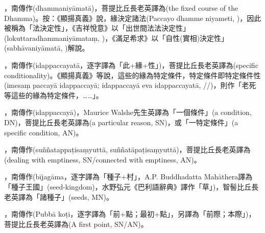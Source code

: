 \startitemgroup[noteitems]
\item{}，南傳作(dhammaniyāmatā)，菩提比丘長老英譯為(the fixed course of the Dhamma)。按：《顯揚真義》說，緣決定諸法(Paccayo dhamme niyameti, )，因此被稱為「法決定性」，《吉祥悅意》以「出世間法法決定性」(lokuttaradhammaniyāmataṃ, )，《滿足希求》以「自性(實相)決定性」(sabhāvaniyāmatā, )解說。
\stopitemgroup

\startitemgroup[noteitems]
\item{}，南傳作(idappaccayatā，逐字譯為「此+緣+性」)，菩提比丘長老英譯為(specific conditionality)。《顯揚真義》等說，這些的緣為特定條件，特定條件即特定條件性(imesaṃ paccayā idappaccayā; idappaccayā eva idappaccayatā, //)，則作「老死等這些的緣為特定條件，……」。
\item{}，南傳作(idappaccayā)，Maurice Walshe先生英譯為「一個條件」(a condition, DN)，菩提比丘長老英譯為(a particular reason, SN)，或「一特定條件」(a specific condition, AN)。
\stopitemgroup

\startitemgroup[noteitems]
\item{}，南傳作(suññatappaṭisaṃyuttā, suññatāpaṭisaṃyuttā)，菩提比丘長老英譯為(dealing with emptiness, SN/connected with emptiness, AN)。
\stopitemgroup

\startitemgroup[noteitems]
\item{}，南傳作(bījagāma，逐字譯為「種子+村」，A.P. Buddhadatta Mahāthera譯為「種子王國」(seed-kingdom)，水野弘元《巴利語辭典》譯作「草」)，智髻比丘長老英譯為「諸種子」(seeds, MN)。
\stopitemgroup

\startitemgroup[noteitems]
\item{}，南傳作(Pubbā koṭi，逐字譯為「前+點；最初+點」，另譯為「前際；本際」)，菩提比丘長老英譯為(A first point, SN/AN)。
\stopitemgroup

